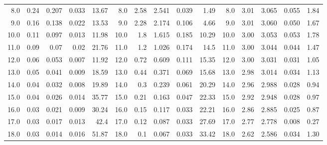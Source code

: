 \begin{table}[H]
{\begin{tabular}{rrrrrrrrrrrrrrr}
    8.0 &  0.24 &       0.207 &          0.033 &          13.67 &    8.0 &  2.58 &       2.541 &          0.039 &           1.49 &     8.0 &  3.01 &       3.065 &          0.055 &           1.84 \\
    9.0 &  0.16 &       0.138 &          0.022 &          13.53 &    9.0 &  2.28 &       2.174 &          0.106 &           4.66 &     9.0 &  3.01 &       3.060 &          0.050 &           1.67 \\
   10.0 &  0.11 &       0.097 &          0.013 &          11.98 &   10.0 &   1.8 &       1.615 &          0.185 &          10.29 &    10.0 &  3.00 &       3.053 &          0.053 &           1.78 \\
   11.0 &  0.09 &        0.07 &           0.02 &          21.76 &   11.0 &   1.2 &       1.026 &          0.174 &           14.5 &    11.0 &  3.00 &       3.044 &          0.044 &           1.47 \\
   12.0 &  0.06 &       0.053 &          0.007 &          11.92 &   12.0 &  0.72 &       0.609 &          0.111 &          15.35 &    12.0 &  3.00 &       3.031 &          0.031 &           1.05 \\
   13.0 &  0.05 &       0.041 &          0.009 &          18.59 &   13.0 &  0.44 &       0.371 &          0.069 &          15.68 &    13.0 &  2.98 &       3.014 &          0.034 &           1.13 \\
   14.0 &  0.04 &       0.032 &          0.008 &          19.89 &   14.0 &   0.3 &       0.239 &          0.061 &          20.29 &    14.0 &  2.96 &       2.988 &          0.028 &           0.94 \\
   15.0 &  0.04 &       0.026 &          0.014 &          35.77 &   15.0 &  0.21 &       0.163 &          0.047 &          22.33 &    15.0 &  2.92 &       2.948 &          0.028 &           0.97 \\
   16.0 &  0.03 &       0.021 &          0.009 &          30.24 &   16.0 &  0.15 &       0.117 &          0.033 &          22.21 &    16.0 &  2.86 &       2.885 &          0.025 &           0.87 \\
   17.0 &  0.03 &       0.017 &          0.013 &           42.4 &   17.0 &  0.12 &       0.087 &          0.033 &          27.69 &    17.0 &  2.77 &       2.778 &          0.008 &           0.27 \\
   18.0 &  0.03 &       0.014 &          0.016 &          51.87 &   18.0 &   0.1 &       0.067 &          0.033 &          33.42 &    18.0 &  2.62 &       2.586 &          0.034 &           1.30 \\

\end{tabular}}
\end{table}
